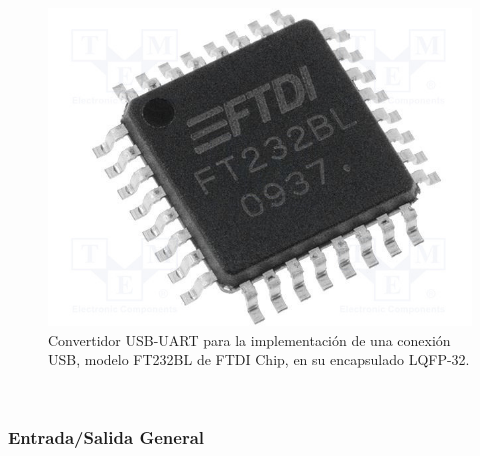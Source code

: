 \begin{figure}[h]
    \centering
    \includegraphics[scale=0.2]{Imagenes/FT232BL.jpg}
    \caption{Convertidor USB-UART para la implementación de una conexión USB, modelo FT232BL de FTDI Chip, en su encapsulado LQFP-32.}
    \label{ft232bl}
\end{figure}

\lipsum[3]\\

\subsubsection{Entrada/Salida General}

\lipsum[4]\\